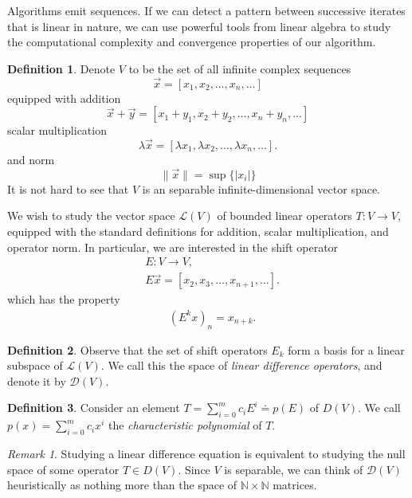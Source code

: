 \documentclass[12pt]{article}
\theoremstyle{plain}
\theoremstyle{definition}
\newtheorem*{definition}{Definition}
\theoremstyle{remark}
\newtheorem*{remark}{Remark}
\numberwithin{equation}{section}  %
\begin{document}
Algorithms emit sequences. If we can detect a pattern between successive
iterates that is linear in nature, we can use powerful tools from linear
algebra to study the computational complexity and convergence properties of our
algorithm.
\begin{definition}
Denote $V$ to be the set of all infinite complex sequences
\begin{equation*}
\vec{x} = [x_1, x_2, \ldots, x_n, \ldots]
\end{equation*}
equipped with addition
\begin{equation*}
\vec{x} + \vec{y} = [x_1 + y_1, x_2 + y_2, \ldots, x_n + y_n, \ldots]	
\end{equation*}
scalar multiplication
\begin{equation*}
\lambda \vec{x} = [\lambda x_1, \lambda x_2, \ldots, \lambda x_n, \ldots].
\end{equation*}
and norm
\begin{equation*}
\| \vec{x} \| = \sup \{|x_i| \}
\end{equation*}
It is not hard to see that $V$ is an separable infinite-dimensional vector
space.
\end{definition}
We wish to study the vector space $\mathcal{L}(V)$ of bounded linear operators
$T:
V \to V$, equipped with the standard definitions for addition, scalar
multiplication, and operator norm.
In particular, we are interested in the shift operator
\begin{align*}
& E: V \to V,
\\
& E \vec{x} = [x_2, x_3, \ldots, x_{n+1}, \ldots].
\end{align*}
which has the property 
\begin{align*}
& (E^k x)_{n} = x_{n+k}.
\end{align*}
\begin{definition}
Observe that the set of shift operators ${E_k}$ form a basis for a
linear subspace of $\mathcal{L}(V)$. We call this the space of
\emph{linear difference operators}, and denote it by $\mathcal{D}(V)$.
\end{definition}
\begin{definition}
Consider an element $T = \sum_{i=0}^{m}c_i E^i \doteq p(E)$ of $D(V).$ We call
$p(x) = \sum_{i=0}^{m} c_i x^i$ the \emph{characteristic polynomial} of $T$.
\end{definition}
\begin{remark}
Studying a linear difference equation is equivalent to studying the null space
of some operator $T \in D(V)$. Since $V$ is separable, we can think of
$\mathcal{D}(V)$ heuristically as nothing more than the space of $\mathbb{N}
\times \mathbb{N}$ matrices. 
\end{remark}
\end{document}
